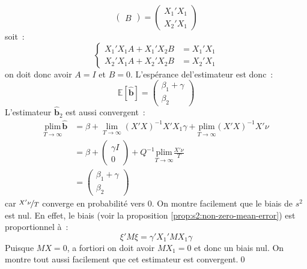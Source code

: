 \documentclass[10pt]{beamer}
\theoremstyle{plain}
\begin{document}
\begin{notes}
\[\begin{pmatrix}
      B
    \end{pmatrix} =
    \begin{pmatrix}
      X_1'X_1\\
      X_2'X_1
    \end{pmatrix}
  \]
  soit~:
  \[
    \begin{cases}
      X_1'X_1 A +X_1'X_2 B &= X_1'X_1\\
      X_2'X_1 A +X_2'X_2 B &= X_2'X_1
    \end{cases}
  \]
  on doit donc avoir $A=I$ et $B=0$. L'espérance del'estimateur est donc~:
  \[
    \mathbb E\left[ \hat{\mathbf b} \right] =
    \begin{pmatrix}
      \beta_1 + \gamma\\ \beta_2
    \end{pmatrix}
  \]
  L'estimateur $\hat{\mathbf b}_2$ est aussi convergent~:
  \[
    \begin{split}
      \underset{T\rightarrow\infty}{\text{plim}} \hat{\mathbf b} &= \beta
    +
    \underset{T\rightarrow\infty}{\lim} (X'X)^{-1}X'X_1\gamma
                                                                   + \underset{T\rightarrow\infty}{\text{plim}} (X'X)^{-1}X'\nu\\
                                                                 &= \beta
                                                                   +
                                                                   \begin{pmatrix}
                                                                     \gamma I\\
                                                                     0
                                                                   \end{pmatrix}
                                                                   + Q^{-1}\underset{T\rightarrow\infty}{\text{plim}} \frac{X'\nu}{T}\\
                                                                 &=
                                                                   \begin{pmatrix}
                                                                     \beta_1+\gamma\\
                                                                     \beta_2
                                                                   \end{pmatrix}
    \end{split}
  \]
  car $\nicefrac{X'\nu}{T}$ converge en probabilité vers 0. On montre facilement que le biais de $s^2$ est nul. En effet, le biais (voir la proposition \ref{prop:s2:non-zero-mean-error}) est proportionnel à~:
  \[
    \xi'M\xi = \gamma'X_1'M X_1\gamma
  \]
Puisque $MX=0$, a fortiori on doit avoir $MX_1=0$ et donc un biais nul. On montre tout aussi facilement que cet estimateur est convergent.\qed
\end{notes}
\end{document}
